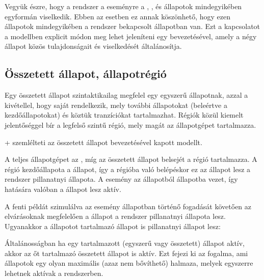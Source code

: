 Vegyük észre, hogy a rendszer a  eseményre a , ,  és  állapotok mindegyikében egyformán viselkedik. Ebben az esetben ez annak köszönhető, hogy ezen állapotok mindegyikében a rendszer bekapcsolt állapotban van. Ezt a kapcsolatot a modellben explicit módon meg lehet jeleníteni egy  bevezetésével, amely a négy állapot közös tulajdonságait és viselkedését általánosítja.

\subsection{Összetett állapot, állapotrégió}

Egy összetett állapot szintaktikailag megfelel egy egyszerű állapotnak, azzal a kivétellel, hogy saját  rendelkezik, mely további állapotokat (beleértve a kezdőállapotokat) és köztük tranzíciókat tartalmazhat. Régiók közül kiemelt jelentőséggel bír a legfelső szintű régió, mely magát az állapotgépet tartalmazza.

\Az+ szemlélteti az  összetett állapot bevezetésével kapott modellt.


A teljes állapotgépet az , míg az összetett állapot belsejét a  régió tartalmazza. A  régió kezdőállapota a  állapot, így a régióba való belépéskor ez az állapot lesz a rendszer pillanatnyi állapota. A  esemény az  állapotból  állapotba vezet, így hatására valóban a  állapot lesz aktív.

A fenti példát szimulálva az  esemény  állapotban történő fogadását követően az elvárásoknak megfelelően a  állapot a rendszer pillanatnyi állapota lesz. Ugyanakkor a  állapotot tartalmazó  állapot is pillanatnyi állapot lesz:


Általánosságban ha egy tartalmazott (egyszerű vagy összetett) állapot aktív, akkor az őt tartalmazó összetett állapot is aktív. Ezt fejezi ki az  fogalma, ami állapotok egy olyan maximális (azaz nem bővíthető) halmaza, melyek egyszerre lehetnek aktívak a rendszerben.

